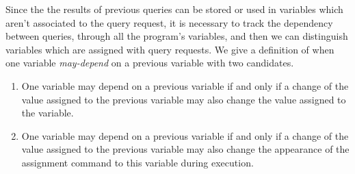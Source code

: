 Since the the results of previous queries can be stored or used in variables
which aren't associated to the query request,
it is necessary to track the dependency between queries, through all the program's variables,  
and then we can distinguish variables which are assigned with query requests.
 We give a definition of when one variable \emph{may-depend} on a previous variable with two candidates.
{
\begin{enumerate}
    \item One variable may depend on a previous variable if and only if a change of the value assigned to the previous variable may also change the value assigned to the variable.
    \item One variable may depend on a previous variable if and only if a change of the value assigned to the previous variable may also change the appearance of the assignment command to this variable 
    during execution.
\end{enumerate}
}


